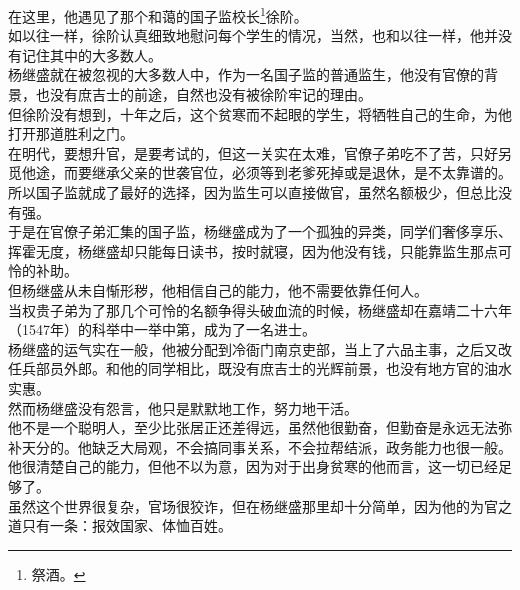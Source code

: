 \begin{multicols}{\theparacolNo}
在这里，他遇见了那个和蔼的国子监校长\footnote{祭酒。}徐阶。\\

如以往一样，徐阶认真细致地慰问每个学生的情况，当然，也和以往一样，他并没有记住其中的大多数人。\\

杨继盛就在被忽视的大多数人中，作为一名国子监的普通监生，他没有官僚的背景，也没有庶吉士的前途，自然也没有被徐阶牢记的理由。\\

但徐阶没有想到，十年之后，这个贫寒而不起眼的学生，将牺牲自己的生命，为他打开那道胜利之门。\\

在明代，要想升官，是要考试的，但这一关实在太难，官僚子弟吃不了苦，只好另觅他途，而要继承父亲的世袭官位，必须等到老爹死掉或是退休，是不太靠谱的。\\

所以国子监就成了最好的选择，因为监生可以直接做官，虽然名额极少，但总比没有强。\\

于是在官僚子弟汇集的国子监，杨继盛成为了一个孤独的异类，同学们奢侈享乐、挥霍无度，杨继盛却只能每日读书，按时就寝，因为他没有钱，只能靠监生那点可怜的补助。\\

但杨继盛从未自惭形秽，他相信自己的能力，他不需要依靠任何人。\\

当权贵子弟为了那几个可怜的名额争得头破血流的时候，杨继盛却在嘉靖二十六年（1547年）的科举中一举中第，成为了一名进士。\\

杨继盛的运气实在一般，他被分配到冷衙门南京吏部，当上了六品主事，之后又改任兵部员外郎。和他的同学相比，既没有庶吉士的光辉前景，也没有地方官的油水实惠。\\

然而杨继盛没有怨言，他只是默默地工作，努力地干活。\\

他不是一个聪明人，至少比张居正还差得远，虽然他很勤奋，但勤奋是永远无法弥补天分的。他缺乏大局观，不会搞同事关系，不会拉帮结派，政务能力也很一般。\\

他很清楚自己的能力，但他不以为意，因为对于出身贫寒的他而言，这一切已经足够了。\\

虽然这个世界很复杂，官场很狡诈，但在杨继盛那里却十分简单，因为他的为官之道只有一条：报效国家、体恤百姓。\\


\end{multicols}
